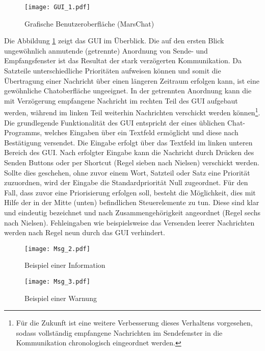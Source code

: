 \begin{figure}[H]
	\centering
	\texttt{[image: GUI\_1.pdf]}
	\caption{Grafische Benutzeroberfläche (MarsChat)}
	\label{fig:GUI}
\end{figure}

Die Abbildung \ref{fig:GUI} zeigt das \gls{GUI} im {\"U}berblick. Die auf den
ersten Blick ungew{\"o}hnlich anmutende (getrennte) Anordnung von Sende- und
Empfangsfenster ist das Resultat der stark verz{\"o}gerten Kommunikation. Da
Satzteile unterschiedliche Priorit{\"a}ten aufweisen k{\"o}nnen und somit die
{\"U}bertragung einer Nachricht {\"u}ber einen l{\"a}ngeren Zeitraum erfolgen
kann, ist eine gew{\"o}hnliche Chatoberfl{\"a}che ungeeignet. In der getrennten
Anordnung kann die mit Verz{\"o}gerung empfangene Nachricht im rechten Teil des
\gls{GUI} aufgebaut werden, w{\"a}hrend im linken Teil weiterhin Nachrichten
verschickt werden k{\"o}nnen\footnote{F{\"u}r die Zukunft ist eine weitere Verbesserung dieses
Verhaltens vorgesehen, sodass vollst{\"a}ndig empfangene Nachrichten im
Sendefenster in die Kommunikation chronologisch eingeordnet werden.}. \newline
\newline Die grundlegende Funktionalit{\"a}t des \gls{GUI} entspricht der eines
{\"u}blichen Chat-Programms, welches Eingaben {\"u}ber ein Textfeld erm{\"o}glicht und diese
nach Best{\"a}tigung versendet. Die Eingabe erfolgt {\"u}ber das Textfeld im
linken unteren Bereich des \gls{GUI}. Nach erfolgter Eingabe kann die Nachricht
durch Dr{\"u}cken des Senden Buttons oder per Shortcut (Regel sieben nach
Nielsen) verschickt werden.
Sollte dies geschehen, ohne zuvor einem Wort, Satzteil oder Satz eine
Priorit{\"a}t zuzuordnen, wird der Eingabe die Standardpriorit{\"a}t Null
zugeordnet. F{\"u}r den Fall, dass zuvor eine Priorisierung erfolgen soll,
besteht die M{\"o}glichkeit, dies mit Hilfe der in der Mitte (unten)
befindlichen Steuerelemente zu tun. Diese sind klar und eindeutig bezeichnet und nach
Zusammengeh{\"o}rigkeit angeordnet (Regel sechs nach Nielsen). Fehleingaben wie
beispielsweise das Versenden leerer Nachrichten werden nach Regel neun durch das
\gls{GUI} verhindert.

\begin{figure}[H]
	\centering
	\texttt{[image: Msg\_2.pdf]}
	\caption{Beispiel einer Information}
	\label{fig:Msg2}
\end{figure}

\begin{figure}[H]
	\centering
	\texttt{[image: Msg\_3.pdf]}
	\caption{Beispiel einer Warnung}
	\label{fig:Msg3}
\end{figure}

